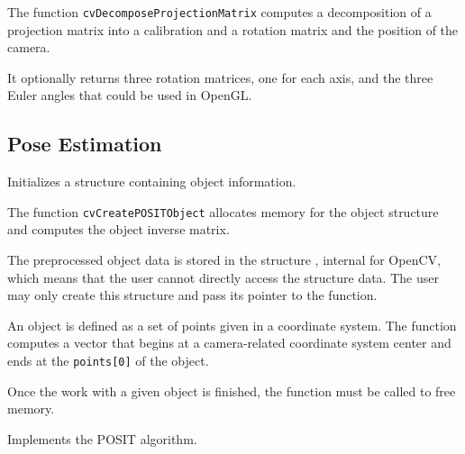 The function \texttt{cvDecomposeProjectionMatrix} computes a decomposition of a projection matrix into a calibration and a rotation matrix and the position of the camera.

It optionally returns three rotation matrices, one for each axis, and the three Euler angles that could be used in OpenGL.


\subsection{Pose Estimation}


\label{CreatePOSITObject}

Initializes a structure containing object information.


\begin{description}
\end{description}

The function \texttt{cvCreatePOSITObject} allocates memory for the object structure and computes the object inverse matrix.

The preprocessed object data is stored in the structure , internal for OpenCV, which means that the user cannot directly access the structure data. The user may only create this structure and pass its pointer to the function.

An object is defined as a set of points given in a coordinate system. The function  computes a vector that begins at a camera-related coordinate system center and ends at the \texttt{points[0]} of the object.

Once the work with a given object is finished, the function  must be called to free memory.

\label{POSIT}

Implements the POSIT algorithm.


